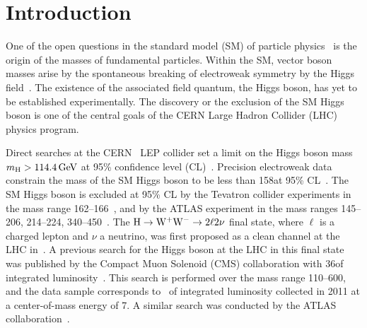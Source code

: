 \documentclass[12pt,twoside,a4paper,cmspaper,final,collab]{cms-tdr}
\begin{document}
\section{Introduction}
One of the open questions in the standard model (SM) of particle
physics~\cite{SM1,SM2,SM3} is the origin of the masses of fundamental
particles. Within the SM, vector boson masses arise by the
spontaneous breaking of electroweak symmetry by the
Higgs field~\cite{Higgs1, Higgs2, Higgs3,Higgs4, Higgs5, Higgs6}.
The existence of the associated field quantum, the Higgs boson, has yet to be
established experimentally. The discovery or the exclusion of the SM
Higgs boson is one of the central goals of the CERN Large Hadron Collider (LHC)
physics program.

Direct searches at the CERN \Pep{}\Pem\ LEP collider set a limit on
the Higgs boson mass $m_{\mathrm{H}} > 114.4\,\text{Ge\hspace{-.08em}V}$ at 95\% confidence level
(CL)~\cite{LEPHIGGS}. Precision electroweak data
constrain the mass of the SM Higgs boson to
be less than 158\GeV at 95\% CL~\cite{EWK}.
The SM Higgs boson is excluded at 95\% CL by the
Tevatron collider experiments in the mass range 162--166\GeV~\cite{TEVHIGGS_2010},
and by the ATLAS experiment in the mass ranges 145--206, 214--224,
340--450\GeV~\cite{AtlasHWW,AtlasHZZ4l,AtlasHZZ2l2n}.
The $\mathrm{H} \to \mathrm{W^+}{}\mathrm{W^-} \to 2\ell 2\nu$ final state, where $\ell$ is a charged lepton
and $\nu$ a neutrino, was first proposed as a clean channel at the LHC in~\cite{dittmar}.
A previous search for the Higgs boson at the LHC in this final state
was published  by the Compact Muon Solenoid (CMS) collaboration
with 36\pbinv of integrated luminosity~\cite{HWW2010}.
This search is performed over the mass range 110--600\GeV, and the data
sample corresponds to \usedLumiWithSyst\ of integrated luminosity
collected in 2011 at a center-of-mass energy of 7\TeV.
A similar search was conducted by the ATLAS collaboration~\cite{AtlasHWW}.
\end{document}
